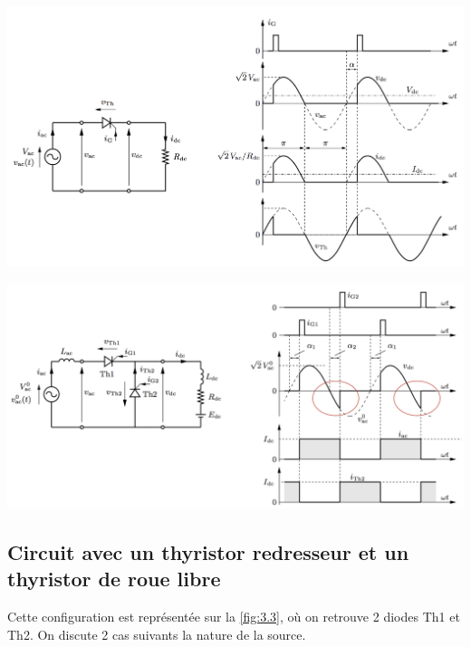 			\begin{minipage}{0.46\textwidth}
				\includegraphics[scale=0.22]{ch3/2}
				\label{fig:3.2}
			\end{minipage}
			\begin{minipage}{0.46\textwidth}
				\includegraphics[scale=0.22]{ch3/3}
				\label{fig:3.3}
			\end{minipage}
			
		\subsection{Circuit avec un thyristor redresseur et un thyristor de roue libre}
			Cette configuration est représentée sur la \autoref{fig:3.3}, où on retrouve 2 diodes Th1 et Th2. On discute 2 cas suivants la nature de la source.  
			
